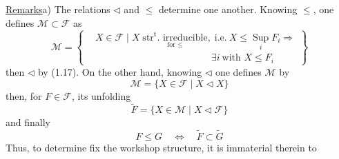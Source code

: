 \uline{Remarks}\quad a) The relations $\triangleleft$ and $\leq$ determine one another. Knowing $\leq$, one defines $\mathcal{M}\subset\mathcal{F}$ as
\[
\mathcal{M}=\left\{\begin{aligned}
&X\in\mathcal{F}\mid X\;
\underset{\text{for }\leq}{\text{$\mathrm{str}^{\mathrm{t}}$. irreducible}},\;
\text{i.e.}\ X\leq\mathop{\mathrm{Sup}}\limits_i F_i\Rightarrow\\
&\hspace{12em}\exists i\ \text{with }X\leq F_i
\end{aligned}\right\}
\tag*{(1.20)}
\]
then $\triangleleft$ by (1.17).
 On the other hand, knowing $\triangleleft$ one defines $\mathcal{M}$ by
\[
\mathcal{M}=\{X\in\mathcal{F}\mid X\triangleleft X\} \tag*{(1.21)}
\]
then, for $F\in\mathcal{F}$, its unfolding
\[
\widetilde F=\{X\in\mathcal{M}\mid X\triangleleft\mathcal{F}\} \tag*{(1.22)}
\]
and finally
\[
F\leq G\quad\Longleftrightarrow\quad\widetilde F\subset\widetilde G \tag*{(1,23)}
\]
Thus, to determine   fix the workshop structure, it is immaterial therein to
